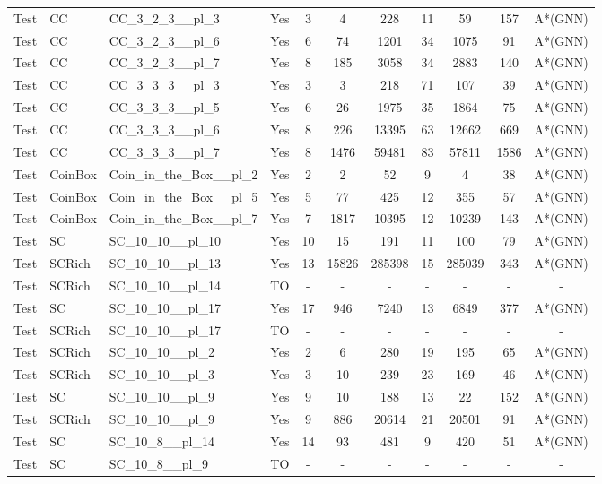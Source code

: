 \documentclass{article}
\begin{document}
\begin{tabular}{lllcccccccc}
Test & CC & CC\_3\_2\_3\_\_pl\_3 & Yes & 3 & 4 & 228 & 11 & 59 & 157 & A*(GNN) \\
Test & CC & CC\_3\_2\_3\_\_pl\_6 & Yes & 6 & 74 & 1201 & 34 & 1075 & 91 & A*(GNN) \\
Test & CC & CC\_3\_2\_3\_\_pl\_7 & Yes & 8 & 185 & 3058 & 34 & 2883 & 140 & A*(GNN) \\
Test & CC & CC\_3\_3\_3\_\_pl\_3 & Yes & 3 & 3 & 218 & 71 & 107 & 39 & A*(GNN) \\
Test & CC & CC\_3\_3\_3\_\_pl\_5 & Yes & 6 & 26 & 1975 & 35 & 1864 & 75 & A*(GNN) \\
Test & CC & CC\_3\_3\_3\_\_pl\_6 & Yes & 8 & 226 & 13395 & 63 & 12662 & 669 & A*(GNN) \\
Test & CC & CC\_3\_3\_3\_\_pl\_7 & Yes & 8 & 1476 & 59481 & 83 & 57811 & 1586 & A*(GNN) \\
Test & CoinBox & Coin\_in\_the\_Box\_\_pl\_2 & Yes & 2 & 2 & 52 & 9 & 4 & 38 & A*(GNN) \\
Test & CoinBox & Coin\_in\_the\_Box\_\_pl\_5 & Yes & 5 & 77 & 425 & 12 & 355 & 57 & A*(GNN) \\
Test & CoinBox & Coin\_in\_the\_Box\_\_pl\_7 & Yes & 7 & 1817 & 10395 & 12 & 10239 & 143 & A*(GNN) \\
Test & SC & SC\_10\_10\_\_pl\_10 & Yes & 10 & 15 & 191 & 11 & 100 & 79 & A*(GNN) \\
Test & SCRich & SC\_10\_10\_\_pl\_13 & Yes & 13 & 15826 & 285398 & 15 & 285039 & 343 & A*(GNN) \\
Test & SCRich & SC\_10\_10\_\_pl\_14 & TO & - & - & - & - & - & - & - \\
Test & SC & SC\_10\_10\_\_pl\_17 & Yes & 17 & 946 & 7240 & 13 & 6849 & 377 & A*(GNN) \\
Test & SCRich & SC\_10\_10\_\_pl\_17 & TO & - & - & - & - & - & - & - \\
Test & SCRich & SC\_10\_10\_\_pl\_2 & Yes & 2 & 6 & 280 & 19 & 195 & 65 & A*(GNN) \\
Test & SCRich & SC\_10\_10\_\_pl\_3 & Yes & 3 & 10 & 239 & 23 & 169 & 46 & A*(GNN) \\
Test & SC & SC\_10\_10\_\_pl\_9 & Yes & 9 & 10 & 188 & 13 & 22 & 152 & A*(GNN) \\
Test & SCRich & SC\_10\_10\_\_pl\_9 & Yes & 9 & 886 & 20614 & 21 & 20501 & 91 & A*(GNN) \\
Test & SC & SC\_10\_8\_\_pl\_14 & Yes & 14 & 93 & 481 & 9 & 420 & 51 & A*(GNN) \\
Test & SC & SC\_10\_8\_\_pl\_9 & TO & - & - & - & - & - & - & - \\

\end{tabular}
\end{document}
